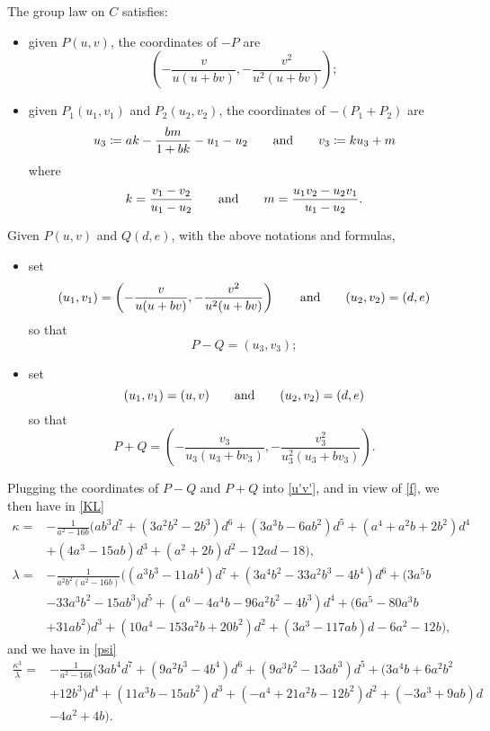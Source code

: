 \documentclass{gtpart}
\theoremstyle{definition}
\theoremstyle{remark}
\newcommand{\ad}{{\rm and}}
\newcommand{\K}{\kappa}
\begin{document}
The group law on $C$ satisfies: 
\begin{itemize}
 \item given $P(u,v)$, the coordinates of $-P$ are 
 \[
  \left( -\frac{v}{u (u + b v)},-\frac{v^2}{u^2 (u + b v)} \right); 
 \]

 \item given $P_1(u_1,v_1)$ and $P_2(u_2,v_2)$, the coordinates of $-(P_1 + P_2)$ are 
 \[
  u_3 \coloneqq a k - \frac{b m}{1 + b k} - u_1 - u_2 \qquad \ad \qquad v_3 \coloneqq k u_3 + m 
 \]
 where 
 \[
  k = \frac{v_1 - v_2}{u_1 - u_2} \qquad \ad \qquad m = \frac{u_1 v_2 - u_2 v_1}{u_1 - u_2}.  
 \]
\end{itemize}
Given $P(u,v)$ and $Q(d,e)$, with the above notations and formulas, 
\begin{itemize}
 \item set 
 \[
  (u_1,v_1) = \left( -\frac{v}{u (u + b v)},-\frac{v^2}{u^2 (u + b v)} \right) \qquad \ad \qquad (u_2,v_2) = (d,e) 
 \]
 so that 
 \[
  P - Q = (u_3,v_3); 
 \]

 \item set 
 \[
  (u_1,v_1) = (u,v) \qquad \ad \qquad (u_2,v_2) = (d,e) 
 \]
 so that 
 \[
  P + Q = \left( -\frac{v_3}{u_3 (u_3 + b v_3)},-\frac{v_3^2}{u_3^2 (u_3 + b v_3)} \right).  
 \]
\end{itemize}
Plugging the coordinates of $P - Q$ and $P + Q$ into \eqref{u'v'}, and in view of \eqref{f}, 
we then have in \eqref{KL} 
\begin{equation*}
\begin{split}
      \K = & -\frac{1}{a^2 - 16 b} \big( a b^3 d^7 + (3 a^2 b^2 - 2 b^3) d^6 + (3 a^3 b - 6 a b^2) d^5 + (a^4 + a^2 b + 2 b^2) d^4 \\
           & + (4 a^3 - 15 a b) d^3 + (a^2 + 2 b) d^2 - 12 a d - 18 \big), \\
 \lambda = & -\frac{1}{a^2 b^2 (a^2 - 16 b)} \big( (a^3  b^3 - 11 a b^4) d^7 + (3 a^4 b^2 - 33 a^2 b^3 - 4 b^4) d^6 + (3 a^5 b \\
           & - 33 a^3 b^2 - 15 a b^3) d^5 + (a^6 - 4 a^4 b - 96 a^2 b^2 - 4 b^3) d^4 + (6 a^5 - 80 a^3 b \\
           & + 31 a b^2) d^3 + (10 a^4 - 153 a^2 b + 20 b^2) d^2 + (3 a^3 - 117 a b) d - 6 a^2 - 12 b \big), 
\end{split}
\end{equation*}
and we have in \eqref{psi} 
\begin{equation*}
\begin{split}
 \frac{\K^3}{\lambda} = & -\frac{1}{a^2 - 16 b} \big( 3 a b^4 d^7 + (9 a^2 b^3 - 4 b^4) d^6 + (9 a^3 b^2 - 13 a b^3) d^5 + (3 a^4 b + 6 a^2 b^2 \\
                        & + 12 b^3) d^4 + (11 a^3 b - 15 a b^2) d^3 + (-a^4 + 21 a^2 b - 12 b^2) d^2 + (-3 a^3 + 9 a b) d \\
                        & - 4 a^2 + 4 b \big).  
\end{split}
\end{equation*}
\end{document}
